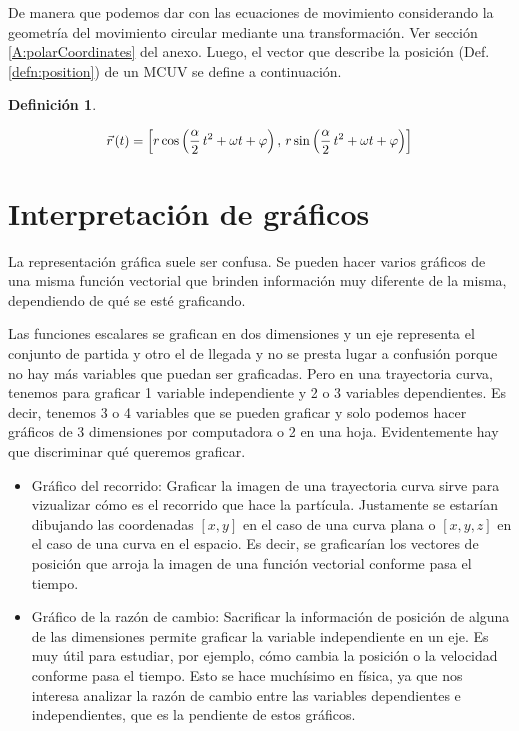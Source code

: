\documentclass[a5paper,12pt,twoside]{book}
\newtheorem{defn}{{Definición}}[chapter]
\begin{document}
De manera que podemos dar con las ecuaciones de movimiento considerando la geometría del movimiento circular mediante una transformación.
Ver sección \ref{A:polarCoordinates} del anexo.
Luego, el vector que describe la posición (Def. \ref{defn:position}) de un MCUV se define a continuación.

\begin{mdframed}[style=MyFrame1]
    \begin{defn}
    \end{defn}
    \begin{equation*}
        \scale{0.94}{
        \xyz(t) = \sqb{r \cos{\left(\frac{\alpha}{2} \, t^2 + \omega t + \varphi\right)} \, , \, r \sin{\left(\frac{\alpha}{2} \, t^2 + \omega t + \varphi\right)}}
        }
    \end{equation*}
\end{mdframed}


\section{Interpretación de gráficos}

La representación gráfica suele ser confusa.
Se pueden hacer varios gráficos de una misma función vectorial que brinden información muy diferente de la misma, dependiendo de qué se esté graficando.

Las funciones escalares se grafican en dos dimensiones y un eje representa el conjunto de partida y otro el de llegada y no se presta lugar a confusión porque no hay más variables que puedan ser graficadas.
Pero en una trayectoria curva, tenemos para graficar 1 variable independiente y 2 o 3 variables dependientes.
Es decir, tenemos 3 o 4 variables que se pueden graficar y solo podemos hacer gráficos de 3 dimensiones por computadora o 2 en una hoja.
Evidentemente hay que discriminar qué queremos graficar.

\begin{itemize}
    \item
    Gráfico del recorrido: Graficar la imagen de una trayectoria curva sirve para vizualizar cómo es el recorrido que hace la partícula.
    Justamente se estarían dibujando las coordenadas $[x,y]$ en el caso de una curva plana o $[x,y,z]$ en el caso de una curva en el espacio.
    Es decir, se graficarían los vectores de posición que arroja la imagen de una función vectorial conforme pasa el tiempo.
    
    \item
    Gráfico de la razón de cambio: Sacrificar la información de posición de alguna de las dimensiones permite graficar la variable independiente en un eje.
    Es muy útil para estudiar, por ejemplo, cómo cambia la posición o la velocidad conforme pasa el tiempo.
    Esto se hace muchísimo en física, ya que nos interesa analizar la razón de cambio entre las variables dependientes e independientes, que es la pendiente de estos gráficos.
\end{itemize}
\end{document}
